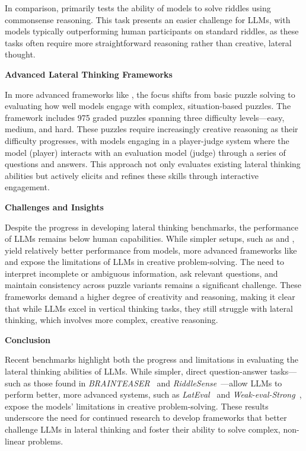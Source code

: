 In comparison,  primarily tests the ability of models to solve riddles using commonsense reasoning. This task presents an easier challenge for \acp{LLM}, with models typically outperforming human participants on standard riddles, as these tasks often require more straightforward reasoning rather than creative, lateral thought.

\textbf{Advanced Lateral Thinking Frameworks}

In more advanced frameworks like , the focus shifts from basic puzzle solving to evaluating how well models engage with complex, situation-based puzzles. The framework includes 975 graded puzzles spanning three difficulty levels—easy, medium, and hard. These puzzles require increasingly creative reasoning as their difficulty progresses, with models engaging in a player-judge system where the model (player) interacts with an evaluation model (judge) through a series of questions and answers. This approach not only evaluates existing lateral thinking abilities but actively elicits and refines these skills through interactive engagement.

\textbf{Challenges and Insights}

Despite the progress in developing lateral thinking benchmarks, the performance of \acp{LLM} remains below human capabilities. While simpler setups, such as  and , yield relatively better performance from models, more advanced frameworks like  and  expose the limitations of \acp{LLM} in creative problem-solving. The need to interpret incomplete or ambiguous information, ask relevant questions, and maintain consistency across puzzle variants remains a significant challenge. These frameworks demand a higher degree of creativity and reasoning, making it clear that while \acp{LLM} excel in vertical thinking tasks, they still struggle with lateral thinking, which involves more complex, creative reasoning.

\textbf{Conclusion}

Recent benchmarks highlight both the progress and limitations in evaluating the lateral thinking abilities of \acp{LLM}. While simpler, direct question-answer tasks—such as those found in \textit{BRAINTEASER}~\cite{jiangBRAINTEASERLateralThinking2023} and \textit{RiddleSense}~\cite{linRiddleSenseReasoningRiddle2021}—allow \acp{LLM} to perform better, more advanced systems, such as \textit{LatEval}~\cite{huangLatEvalInteractiveLLMs2024} and \textit{Weak-eval-Strong}~\cite{chenWeakevalStrongEvaluatingEliciting2024}, expose the models’ limitations in creative problem-solving. These results underscore the need for continued research to develop frameworks that better challenge \acp{LLM} in lateral thinking and foster their ability to solve complex, non-linear problems.
